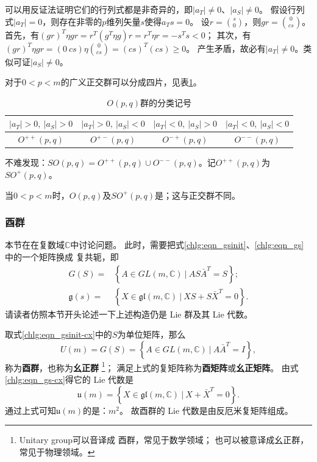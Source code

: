 可以用反证法证明它们的行列式都是非奇异的，即$|a_T| \neq 0$、$|a_S| \neq 0$。
假设行列式$|a_T| = 0$，则存在非零的$p$维列矢量$s$使得$a_T s =0$。
设$r=\binom{s}{0}$，则$gr=\binom{0}{cs}$。
首先，有$(gr)^T \eta gr = r^T (g^T \eta g) r = r^T \eta r = - s^T s <0 $；
其次，有$(gr)^T \eta gr = (0 \  cs) \eta \binom{0}{cs} = (cs)^T (cs)\geqslant 0$。
产生矛盾，故必有$|a_T| \neq 0$。类似可证$|a_S| \neq 0$。

对于$0 < p < m$的广义正交群可以分成四片，见表\ref{chlg:tab-GO}。

\begin{table}[htb]
    \centering
    \caption{$O(p,q)$群的分类记号} \label{chlg:tab-GO}
    \begin{tabular}{|*{4}{c|}}
        \hline 
        $| a_T| >0,\ | a_S |>0$ & $ |a_T| >0,\ | a_S |<0$ & $| a_T| <0,\ | a_S| >0$  & $| a_T| <0,\ | a_S| <0$ \\
        \hline
        $O^{++}(p,q)$ & $O^{+-}(p,q)$ & $O^{-+}(p,q)$ & $O^{--}(p,q)$   \\ 
        \hline
    \end{tabular}
\end{table}

不难发现：$SO(p,q)= O^{++}(p,q)\cup O^{--}(p,q)$。记$O^{++}(p,q)$为$SO^{+}(p,q)$。

当$0<p<m$时，$O(p,q)$及$SO^{+}(p,q)$是；这与正交群不同。

    

\subsubsection{酉群}\label{chlg:sec_unitary}

本节在在复数域$\mathbb{C}$中讨论问题。
此时，需要把式\eqref{chlg:eqn_gsinit}、\eqref{chlg:eqn_gs}中的一个矩阵换成
复共轭，即
\begin{align}
    G(S)=& \left\{ A \in GL(m,\mathbb{C})\ |\  A S \bar{A}^T =S \right\};\label{chlg:eqn_gsinit-cx} \\
    \mathfrak{g}(s) =& \left\{ X \in \mathfrak{gl}(m,\mathbb{C}) \ |\ 
    X S + S \bar{X}^T = 0 \right\} . \label{chlg:eqn_gs-cx}
\end{align}
请读者仿照本节开头论述一下上述构造仍是 Lie 群及其 Lie 代数。

取式\eqref{chlg:eqn_gsinit-cx}中的$S$为单位矩阵，那么
\begin{equation}\label{chlg:eqn_unitary}
    U(m)=G(S)= \left\{ A \in GL(m,\mathbb{C})\ |\ A \bar{A}^T =I \right\},
\end{equation}
称为\textbf{酉群}，也称为\textbf{幺正群}
\footnote{Unitary group可以音译成 {\kaishu 酉群}，常见于数学领域；
    也可以被意译成{\kaishu 幺正群}，常见于物理领域。}；
满足上式的复矩阵称为\textbf{酉矩阵}或\textbf{幺正矩阵}。
由式\eqref{chlg:eqn_gs-cx}得它的 Lie 代数是
\begin{equation}
    \mathfrak{u}(m)= \left\{ X \in 
    \mathfrak{gl}(m,\mathbb{C})\ |\ X  + \bar{X}^T =0 \right\}.
\end{equation}
通过上式可知$\mathfrak{u}(m)$的是：$m^2$。
故酉群的 Lie 代数是由反厄米复矩阵组成。

